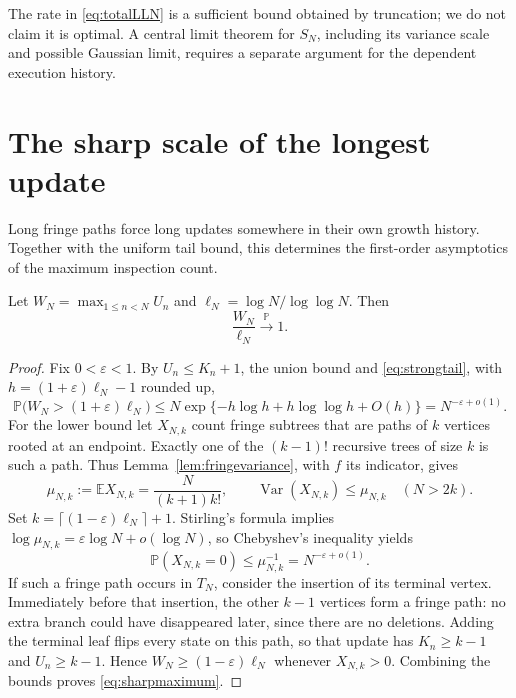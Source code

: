 \documentclass[runningheads,envcountsame,orivec]{llncs}
\newcommand{\E}{\mathbb E}
\newcommand{\PP}{\mathbb P}
\begin{document}
The rate in \eqref{eq:totalLLN} is a sufficient bound obtained by
truncation; we do not claim it is optimal. A central limit theorem for
$S_N$, including its variance scale and possible Gaussian limit,
requires a separate argument for the dependent execution history.

\section{The sharp scale of the longest update}\label{sec:maximum}

Long fringe paths force long updates somewhere in their own growth
history. Together with the uniform tail bound, this determines the
first-order asymptotics of the maximum inspection count.

\begin{theorem}\label{thm:maximum}
Let $W_N=\max_{1\le n<N}U_n$ and
$\ell_N=\log N/\log\log N$. Then
\begin{equation}\label{eq:sharpmaximum}
 \frac{W_N}{\ell_N}\xrightarrow{\mathbb P}1.
\end{equation}
\end{theorem}
\begin{proof}
Fix $0<\varepsilon<1$. By $U_n\le K_n+1$, the union bound and
\eqref{eq:strongtail}, with $h=(1+\varepsilon)\ell_N-1$ rounded up,
\[
 \PP\bigl(W_N>(1+\varepsilon)\ell_N\bigr)
 \le N\exp\{-h\log h+h\log\log h+O(h)\}
 =N^{-\varepsilon+o(1)}.
\]
For the lower bound let $X_{N,k}$ count fringe subtrees that are paths
of $k$ vertices rooted at an endpoint. Exactly one of the $(k-1)!$
recursive trees of size $k$ is such a path. Thus
Lemma~\ref{lem:fringevariance}, with $f$ its indicator, gives
\[
 \mu_{N,k}:=\E X_{N,k}=\frac{N}{(k+1)k!},\qquad
 \operatorname{Var}(X_{N,k})\le\mu_{N,k}\quad(N>2k).
\]
Set $k=\lceil(1-\varepsilon)\ell_N\rceil+1$. Stirling's formula
implies $\log\mu_{N,k}=\varepsilon\log N+o(\log N)$, so Chebyshev's
inequality yields
\[
 \PP(X_{N,k}=0)\le\mu_{N,k}^{-1}=N^{-\varepsilon+o(1)}.
\]
If such a fringe path occurs in $T_N$, consider the insertion of its
terminal vertex. Immediately before that insertion, the other $k-1$
vertices form a fringe path: no extra branch could have disappeared
later, since there are no deletions. Adding the terminal leaf flips
every state on this path, so that update has $K_n\ge k-1$ and
$U_n\ge k-1$. Hence $W_N\ge(1-\varepsilon)\ell_N$ whenever
$X_{N,k}>0$. Combining the bounds proves \eqref{eq:sharpmaximum}.
\end{proof}
\end{document}

